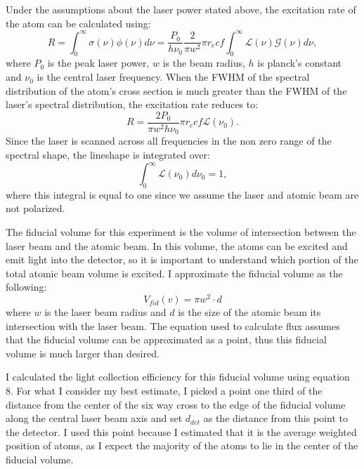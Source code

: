 \documentclass[12pt, a4paper]{article}
\begin{document}
Under the assumptions about the laser power stated above, the excitation rate of the atom can be calculated using:
\begin{equation}
R = \int_{0}^{\infty}\sigma(\nu) \phi(\nu)d\nu = \frac{P_0}{h \nu_0} \frac{2}{\pi w^2} \pi r_e c f \int_{0}^{\infty} \mathscr{L}(\nu) \mathscr{G}(\nu)d \nu,
\end{equation}
where $P_0$ is the peak laser power, $w$ is the beam radius, $h$ is planck's constant and $\nu_0$ is the central laser frequency. When the FWHM of the spectral distribution of the atom's cross section is much greater than the FWHM of the laser's spectral distribution, the excitation rate reduces to:
\begin{equation}
R =\frac{2P_0}{\pi w^2 h \nu_0} \pi r_e c f \mathscr{L} (\nu_0).
\end{equation}
Since the laser is scanned across all frequencies in the non zero range of the spectral shape, the lineshape is integrated over:
\begin{equation}
\int_0^{\infty}\mathscr{L} (\nu_0)d\nu_0 = 1,
\end{equation}
where this integral is equal to one since we assume the laser and atomic beam are not polarized. 

The fiducial volume for this experiment is the volume of intersection between the laser beam and the atomic beam. In this volume, the atoms can be excited and emit light into the detector, so it is important to understand which portion of the total atomic beam volume is excited. I approximate the fiducial volume as the following:
\begin{equation}
V_{fid}(v) = \pi w^2\cdot d
\end{equation}
where $w$ is the laser beam radius and $d$ is the size of the atomic beam its intersection with the laser beam. The equation used to calculate flux assumes that the fiducial volume can be approximated as a point, thus this fiducial volume is much larger than desired. 

I calculated the light collection efficiency for this fiducial volume using equation 8. For what I consider my best estimate, I picked a point one third of the distance from the center of the six way cross to the edge of the fiducial volume along the central laser beam axis and set $d_{det}$ as the distance from this point to the detector. I used this point because I estimated that it is the average weighted position of atoms, as I expect the majority of the atoms to lie in the center of the fiducial volume.
\end{document}
